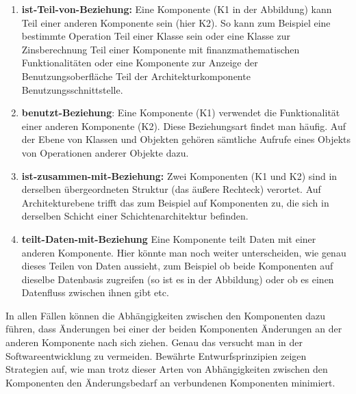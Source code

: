 \vspace{\baselineskip} %

\begin{enumerate}
	\item \textbf{ist-Teil-von-Beziehung:} Eine Komponente (K1 in der Abbildung) kann Teil einer anderen Komponente sein (hier K2). So kann zum Beispiel eine bestimmte Operation Teil einer Klasse sein oder eine Klasse zur Zins\-berechnung Teil einer Komponente mit finanzmathematischen Funktionalitäten oder eine Komponente zur Anzeige der Benutzungsoberfläche Teil der Architektur\-komponente Benutzungsschnittstelle.
	\item \textbf{benutzt-Beziehung}: Eine Komponente (K1) verwendet die Funktionalität einer anderen Komponente (K2). Diese Beziehungsart findet man häufig. Auf der Ebene von Klassen und Objekten gehören sämtliche Aufrufe eines Objekts von Operationen anderer Objekte dazu.
	\item \textbf{ist-zusammen-mit-Beziehung:} Zwei Komponenten (K1 und K2) sind in derselben übergeordneten Struktur (das äußere Rechteck) verortet. Auf 
	\linebreak %
	Architekturebene trifft das zum Beispiel auf Komponenten zu, die sich in derselben Schicht einer Schichtenarchitektur befinden.
	\item \textbf{teilt-Daten-mit-Beziehung} Eine Komponente teilt Daten mit einer anderen Komponente. Hier könnte man noch weiter unterscheiden, wie genau dieses Teilen von Daten aussieht, zum Beispiel ob beide Komponenten auf dieselbe Datenbasis zugreifen (so ist es in der Abbildung) oder ob es einen Datenfluss zwischen ihnen gibt etc.
\end{enumerate}

In allen Fällen können die Abhängigkeiten zwischen den Komponenten dazu führen, dass Änderungen bei einer der beiden Komponenten Änderungen an der anderen Komponente nach sich ziehen. Genau das versucht man in der Softwareentwicklung zu vermeiden. Bewährte Entwurfsprinzipien zeigen Strategien auf, wie man trotz dieser Arten von Abhängigkeiten zwischen den Komponenten den Änderungsbedarf an verbundenen Komponenten minimiert.
